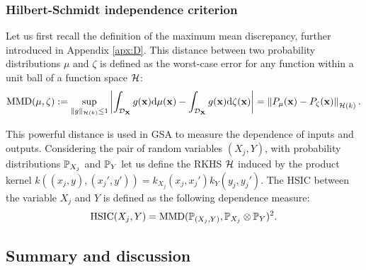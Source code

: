 \subsubsection{Hilbert-Schmidt independence criterion}

Let us first recall the definition of the maximum mean discrepancy, further introduced in Appendix \ref{apx:D}. 
This distance between two probability distributions $\mu$ and $\zeta$ is defined as the worst-case error for any function within a unit ball of a function space $\iH$:
\begin{equation}
    \MMD(\mu, \zeta) := \sup_{\lVert g \lVert_{\iH(k)} \leq 1} \left | \int_{\iD_{\bX}} g(\bx) \dd \mu(\bx) - \int_{\iD_{\bX}} g(\bx) \dd \zeta(\bx) \right| 
    = \left\lVert P_{\mu}(\bx) - P_{\zeta}(\bx) \right\lVert_{\iH(k)}.
    \label{eq:mmd}  
\end{equation}

This powerful distance is used in GSA to measure the dependence of inputs and outputs. 
Considering the pair of random variables $(X_j, Y)$, with probability distributions $\P_{X_j}$ and $\P_Y$ let us define the RKHS $\iH$ 
induced by the product kernel $k((x_j, y), (x_j', y')) = k_{X_j}(x_j, x_j') k_{Y}(y_j, y_j')$. 
The HSIC between the variable $X_j$ and $Y$ is defined as the following dependence measure:
\begin{equation}
    \mathrm{HSIC}(X_j, Y) = \MMD(\P_{(X_j, Y)}, \P_{X_j} \otimes \P_{Y})^2.
\end{equation}





\subsection{Summary and discussion}




